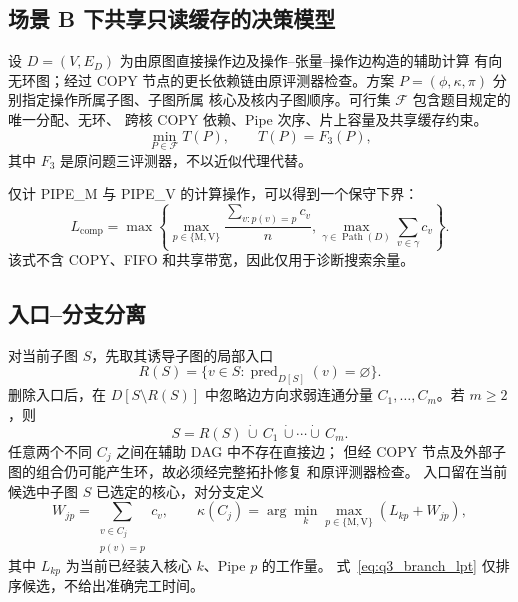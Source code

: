 \subsection{场景 B 下共享只读缓存的决策模型}
设 $D=(V,E_D)$ 为由原图直接操作边及操作--张量--操作边构造的辅助计算
有向无环图；经过 COPY 节点的更长依赖链由原评测器检查。方案
$P=(\phi,\kappa,\pi)$ 分别指定操作所属子图、子图所属
核心及核内子图顺序。可行集 $\mathcal F$ 包含题目规定的唯一分配、无环、
跨核 COPY 依赖、Pipe 次序、片上容量及共享缓存约束。
\begin{equation}
  \min_{P\in\mathcal F} T(P),\qquad T(P)=F_3(P),
  \label{eq:q3_main}
\end{equation}
其中 $F_3$ 是原问题三评测器，不以近似代理代替。

仅计 PIPE\_M 与 PIPE\_V 的计算操作，可以得到一个保守下界：
\begin{equation}
  L_{\mathrm{comp}}=
  \max\left\{
    \max_{p\in\{\mathrm M,\mathrm V\}}
      \frac{\sum_{v:p(v)=p}c_v}{n},
    \max_{\gamma\in\operatorname{Path}(D)}
      \sum_{v\in\gamma}c_v
  \right\}.
  \label{eq:q3_work_lb}
\end{equation}
该式不含 COPY、FIFO 和共享带宽，因此仅用于诊断搜索余量。

\subsection{入口--分支分离}
对当前子图 $S$，先取其诱导子图的局部入口
\begin{equation}
  R(S)=\{v\in S:\operatorname{pred}_{D[S]}(v)=\varnothing\}.
  \label{eq:q3_roots}
\end{equation}
删除入口后，在 $D[S\setminus R(S)]$ 中忽略边方向求弱连通分量
$C_1,\ldots,C_m$。若 $m\ge2$，则
\begin{equation}
  S=R(S)\,\dot\cup\,C_1\,\dot\cup\cdots\dot\cup\,C_m.
  \label{eq:q3_branch_partition}
\end{equation}
任意两个不同 $C_j$ 之间在辅助 DAG 中不存在直接边；
但经 COPY 节点及外部子图的组合仍可能产生环，故必须经完整拓扑修复
和原评测器检查。
入口留在当前候选中子图 $S$ 已选定的核心，对分支定义
\begin{equation}
 W_{jp}=\sum_{\substack{v\in C_j\\p(v)=p}}c_v,\qquad
 \kappa(C_j)=\arg\min_{k}
   \max_{p\in\{\mathrm M,\mathrm V\}}
   \left(L_{kp}+W_{jp}\right),
 \label{eq:q3_branch_lpt}
\end{equation}
其中 $L_{kp}$ 为当前已经装入核心 $k$、Pipe $p$ 的工作量。
式~\eqref{eq:q3_branch_lpt} 仅排序候选，不给出准确完工时间。

